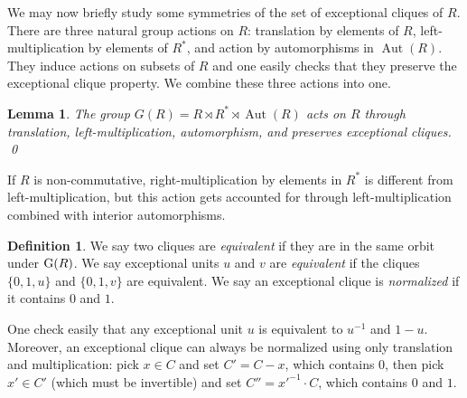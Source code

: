 \documentclass{amsart}
\theoremstyle{plain}
\newtheorem{lemma}[theorem]{Lemma}
\theoremstyle{definition}
\newtheorem{definition}[theorem]{Definition}
\DeclareMathOperator{\Aut}{Aut}
\newcommand{\tensor}{\otimes}
\newcommand{\clq}{C}
\newcommand{\nrg}{R}
\begin{document}


We may now briefly study some symmetries of the set of exceptional cliques of $\nrg$. There are three natural group actions on $\nrg$: translation by elements of $\nrg$, left-multiplication by elements of $\nrg^*$, and action by automorphisms in $\Aut(\nrg)$. They induce actions on subsets of $\nrg$ and one easily checks that they preserve the exceptional clique property. We combine these three actions into one.

\begin{lemma}\label{lem:equivalent_clique}
The group \(G(\nrg)=\nrg\rtimes \nrg^* \rtimes\Aut(\nrg)\) acts on $R$ through translation, left-multiplication, automorphism, and preserves exceptional cliques. \qed
\end{lemma}

If $\nrg$ is non-commutative, right-multiplication by elements in $\nrg^*$ is different from left-multiplication, but this action gets accounted for through left-multiplication combined with interior automorphisms.

\begin{definition}\label{def:clique_equivalence}
	We say two cliques are \emph{equivalent} if they are in the same orbit under \(\textup{G}(\nrg)\). 
	We say exceptional units \(u\) and \(v\) are \emph{equivalent} if the cliques \(\{0,1,u\}\) and \(\{0,1,v\}\) are equivalent.
	We say an exceptional clique is \emph{normalized} if it contains \(0\) and \(1\).
\end{definition}

One check easily that any exceptional unit \(u\) is equivalent to \(u^{-1}\) and \(1-u\). Moreover, an exceptional clique can always be normalized using only translation and multiplication: pick $x\in\clq$ and set $\clq'=\clq-x$, which contains $0$, then pick $x'\in\clq'$ (which must be invertible) and set $\clq''={x'}^{-1}\cdot\clq$, which contains $0$ and $1$.
\end{document}
